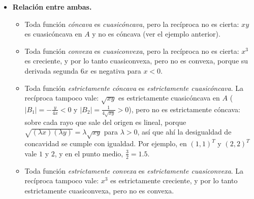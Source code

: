 \documentclass{article}
\begin{document}
\begin{itemize}
  \item \textbf{Relación entre ambas.}
    \begin{itemize}
      \item Toda función \emph{cóncava} es \emph{cuasicóncava}, pero la recíproca no es cierta: \(xy\) es cuasicóncava en \(A\) y no es cóncava (ver el ejemplo anterior).
      \item Toda función \emph{convexa} es \emph{cuasiconvexa}, pero la recíproca no es cierta: \(x^3\) es creciente, y por lo tanto cuasiconvexa, pero no es convexa, porque su derivada segunda \(6x\) es negativa para \(x<0\).
      \item Toda función \emph{estrictamente cóncava} es \emph{estrictamente cuasicóncava}. La recíproca tampoco vale: \(\sqrt{xy}\) es estrictamente cuasicóncava en \(A\) (\(|B_1|=-\tfrac{y}{4x}<0\) y \(|B_2|=\tfrac{1}{4\sqrt{xy}}>0\)), pero no es estrictamente cóncava: sobre cada rayo que sale del origen es lineal, porque \(\sqrt{(\lambda x)(\lambda y)}=\lambda\sqrt{xy}\) para \(\lambda>0\), así que ahí la desigualdad de concavidad se cumple con igualdad. Por ejemplo, en \((1,1)^T\) y \((2,2)^T\) vale \(1\) y \(2\), y en el punto medio, \(\tfrac32=1.5\).
      \item Toda función \emph{estrictamente convexa} es \emph{estrictamente cuasiconvexa}. La recíproca tampoco vale: \(x^3\) es estrictamente creciente, y por lo tanto estrictamente cuasiconvexa, pero no es convexa.
    \end{itemize}


\end{itemize}
\end{document}
